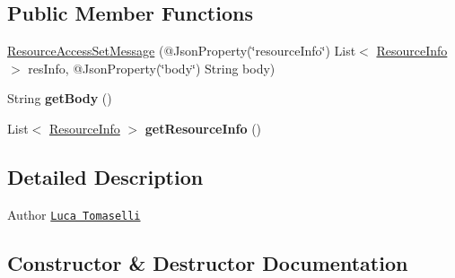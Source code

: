 \subsection*{Public Member Functions}
\begin{DoxyCompactItemize}
\item 
\hyperlink{classeu_1_1h2020_1_1symbiote_1_1enabler_1_1messaging_1_1model_1_1rap_1_1access_1_1ResourceAccessSetMessage_a44a1bca9e7355a27acc67c16f213f874}{Resource\+Access\+Set\+Message} (@Json\+Property(\char`\"{}resource\+Info\char`\"{}) List$<$ \hyperlink{classeu_1_1h2020_1_1symbiote_1_1enabler_1_1messaging_1_1model_1_1rap_1_1db_1_1ResourceInfo}{Resource\+Info} $>$ res\+Info, @Json\+Property(\char`\"{}body\char`\"{}) String body)
\item 
\mbox{\label{classeu_1_1h2020_1_1symbiote_1_1enabler_1_1messaging_1_1model_1_1rap_1_1access_1_1ResourceAccessSetMessage_a190322878dacffb73551e73786f72beb}} 
String {\bfseries get\+Body} ()
\item 
\mbox{\label{classeu_1_1h2020_1_1symbiote_1_1enabler_1_1messaging_1_1model_1_1rap_1_1access_1_1ResourceAccessSetMessage_aa6070ecc8613dc0fd93e49118b86f351}} 
List$<$ \hyperlink{classeu_1_1h2020_1_1symbiote_1_1enabler_1_1messaging_1_1model_1_1rap_1_1db_1_1ResourceInfo}{Resource\+Info} $>$ {\bfseries get\+Resource\+Info} ()
\end{DoxyCompactItemize}


\subsection{Detailed Description}
\begin{DoxyAuthor}{Author}
\href{mailto:l.tomaselli@nextworks.it}{\tt Luca Tomaselli} 
\end{DoxyAuthor}


\subsection{Constructor \& Destructor Documentation}
\mbox{\label{classeu_1_1h2020_1_1symbiote_1_1enabler_1_1messaging_1_1model_1_1rap_1_1access_1_1ResourceAccessSetMessage_a44a1bca9e7355a27acc67c16f213f874}} 
